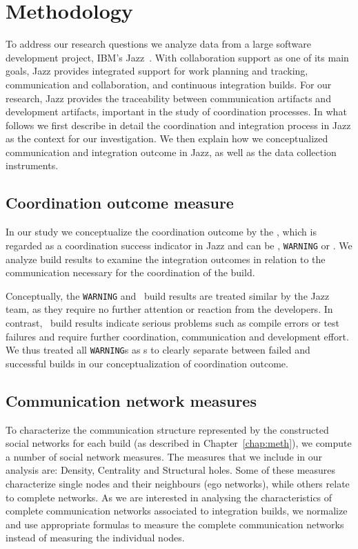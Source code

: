 \section{Methodology}
\label{sec:Methodology}

To address our research questions we analyze data from a large software
development project, IBM's Jazz~\cite{frost:ieeesoftware:2007}. With collaboration support
as one of its main goals, Jazz provides integrated support for work planning and
tracking, communication and collaboration, and continuous integration builds. For
our research, Jazz provides the traceability between communication artifacts and
development artifacts, important in the study of coordination processes. In what
follows we first describe in detail the coordination and integration process in
Jazz as the context for our investigation. We then explain how we conceptualized
communication and integration outcome in Jazz, as well as the data collection
instruments.

\subsection{Coordination outcome measure}
In our study we conceptualize the coordination outcome by the ,
which is regarded as a coordination success indicator in Jazz and can be \error,
\texttt{WARNING} or \ok. We analyze build results to examine the integration
outcomes in relation to the communication necessary for the coordination of the
build.

Conceptually, the \texttt{WARNING} and \ok\ build results are treated similar by
the Jazz team, as they require no further attention or reaction from the
developers. In contrast, \error\ build results indicate serious problems such as
compile errors or test failures and require further coordination, communication
and development effort. We thus treated all \texttt{WARNING}s as \ok s to clearly
separate between failed and successful builds in our conceptualization of
coordination outcome.


\subsection{Communication network measures}
To characterize the communication structure represented by the constructed social
networks for each build (as described in Chapter~\ref{chap:meth}), we compute a number of social network measures. The
measures that we include in our analysis are: Density, Centrality and Structural
holes. Some of these measures characterize single nodes and their neighbours (ego
networks), while others relate to complete networks. As we are interested in
analysing the characteristics of complete communication networks associated to
integration builds, we normalize and use appropriate formulas to measure the
complete communication networks instead of measuring the individual nodes.

